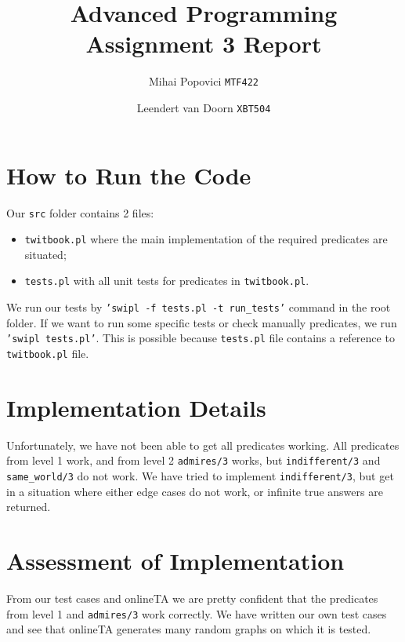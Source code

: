 \documentclass{article}
\title{Advanced Programming Assignment 3 Report}
\author{Mihai Popovici \texttt{MTF422} \and Leendert van Doorn \texttt{XBT504}}
\begin{document}
\maketitle

\section{How to Run the Code}
Our \texttt{src} folder contains 2 files:
\begin{itemize}
	\item \texttt{twitbook.pl} where the main implementation of the required predicates are situated;
	\item \texttt{tests.pl} with all unit tests for predicates in \texttt{twitbook.pl}.  
\end{itemize} 
We run our tests by \texttt{'swipl -f tests.pl -t run\_tests'} command in the root folder.
If we want to run some specific tests or check manually predicates, we run \texttt{'swipl tests.pl'}. This is possible because \texttt{tests.pl} file contains a reference to \texttt{twitbook.pl} file.

\section{Implementation Details}
Unfortunately, we have not been able to get all predicates working. All predicates from level 1 work, and from level 2 \texttt{admires/3} works, but \texttt{indifferent/3} and \texttt{same\_world/3} do not work. We have tried to implement \texttt{indifferent/3}, but get in a situation where either edge cases do not work, or infinite true answers are returned. 

\section{Assessment of Implementation}
From our test cases and onlineTA we are pretty confident that the predicates from level 1 and \texttt{admires/3} work correctly. We have written our own test cases and see that onlineTA generates many random graphs on which it is tested.
\end{document}
